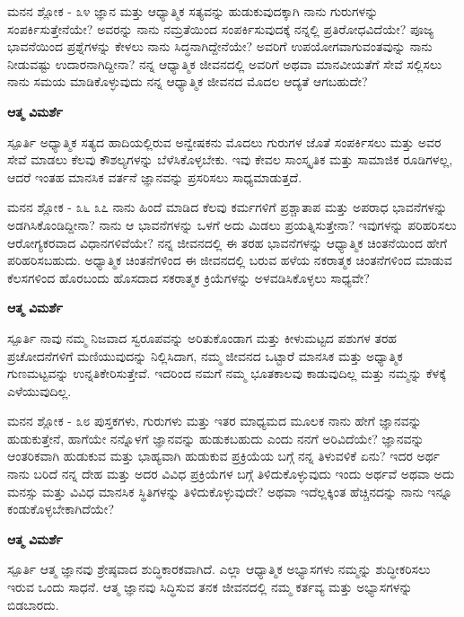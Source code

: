 \begin{mananam}{\mananamfont ಮನನ ಶ್ಲೋಕ - ೩೪}
\mananamtext ಜ್ಞಾನ ಮತ್ತು ಆಧ್ಯಾತ್ಮಿಕ ಸತ್ಯವನ್ನು ಹುಡುಕುವುದಕ್ಕಾಗಿ ನಾನು ಗುರುಗಳನ್ನು ಸಂಪರ್ಕಿಸುತ್ತೇನೆಯೇ? ಅವರನ್ನು ನಾನು ನಮ್ರತೆಯಿಂದ ಸಂಪರ್ಕಿಸುವುದಕ್ಕೆ ನನ್ನಲ್ಲಿ ಪ್ರತಿರೋಧವಿದೆಯೇ? ಪೂಜ್ಯ ಭಾವನೆಯಿಂದ ಪ್ರಶ್ನೆಗಳನ್ನು ಕೇಳಲು ನಾನು ಸಿದ್ಧನಾಗಿದ್ದೇನೆಯೇ? ಅವರಿಗೆ ಉಪಯೋಗವಾಗುವಂತವುನ್ನು ನಾನು ನೀಡುವಷ್ಟು ಉದಾರನಾಗಿದ್ದೀನಾ? ನನ್ನ ಆಧ್ಯಾತ್ಮಿಕ ಜೀವನದಲ್ಲಿ ಅವರಿಗೆ ಅಥವಾ ಮಾನವೀಯತೆಗೆ ಸೇವೆ ಸಲ್ಲಿಸಲು ನಾನು ಸಮಯ ಮಾಡಿಕೊಳ್ಳುವುದು ನನ್ನ ಆಧ್ಯಾತ್ಮಿಕ ಜೀವನದ ಮೊದಲ ಆದ್ಯತೆ ಆಗಬಹುದೇ?
\end{mananam}
\WritingHand\enspace\textbf{ಆತ್ಮ ವಿಮರ್ಶೆ}\\
\begin{inspiration}{\mananamfont ಸ್ಪೂರ್ತಿ}
\mananamtext ಅಧ್ಯಾತ್ಮಿಕ ಸತ್ಯದ ಹಾದಿಯಲ್ಲಿರುವ ಅನ್ವೇಷಕನು ಮೊದಲು ಗುರುಗಳ ಜೊತೆ ಸಂಪರ್ಕಿಸಲು ಮತ್ತು ಅವರ ಸೇವೆ ಮಾಡಲು ಕೆಲವು ಕೌಶಲ್ಯಗಳನ್ನು ಬೆಳೆಸಿಕೊಳ್ಳಬೇಕು. ಇವು ಕೇವಲ ಸಾಂಸ್ಕೃತಿಕ ಮತ್ತು ಸಾಮಾಜಿಕ ರೂಡಿಗಳಲ್ಲ, ಆದರೆ ಇಂತಹ ಮಾನಸಿಕ ವರ್ತನೆ ಜ್ಞಾನವನ್ನು ಪ್ರಸರಿಸಲು ಸಾಧ್ಯಮಾಡುತ್ತದೆ.
\end{inspiration}

\newpage
\begin{mananam}{\mananamfont ಮನನ ಶ್ಲೋಕ - ೩೬ ೩೭}
\mananamtext ನಾನು ಹಿಂದೆ ಮಾಡಿದ ಕೆಲವು ಕರ್ಮಗಳಿಗೆ ಪ್ರಶ್ಚಾತಾಪ  ಮತ್ತು ಅಪರಾಧ ಭಾವನೆಗಳನ್ನು ಅಡಗಿಸಿಕೊಂಡಿದ್ದೀನಾ? ನಾನು ಆ ಭಾವನೆಗಳನ್ನು ಒಳಗೆ ಅದು ಮಿಡಲು ಪ್ರಯತ್ನಿಸುತ್ತೇನಾ? ಇವುಗಳನ್ನು ಪರಿಹರಿಸಲು ಆರೋಗ್ಯಕರವಾದ ವಿಧಾನಗಳಿವೆಯೇ? ನನ್ನ ಜೀವನದಲ್ಲಿ ಈ ತರಹ ಭಾವನೆಗಳನ್ನು ಆಧ್ಯಾತ್ಮಿಕ ಚಿಂತನೆಯಿಂದ ಹೇಗೆ ಪರಿಹರಿಸಬಹುದು. ಅಧ್ಯಾತ್ಮಿಕ ಚಿಂತನೆಗಳಿಂದ ಈ ಜೀವನದಲ್ಲಿ ಬರುವ ಹಳೆಯ ನಕರಾತ್ಮಕ ಚಿಂತನೆಗಳಿಂದ ಮಾಡುವ ಕೆಲಸಗಳಿಂದ ಹೊರಬಂದು ಹೊಸದಾದ ಸಕರಾತ್ಮಕ ಕ್ರಿಯೆಗಳನ್ನು ಅಳವಡಿಸಿಕೊಳ್ಳಲು ಸಾಧ್ಯವೇ?\\
\end{mananam}
\WritingHand\enspace\textbf{ಆತ್ಮ ವಿಮರ್ಶೆ}\\
\begin{inspiration}{\mananamfont ಸ್ಪೂರ್ತಿ}
\mananamtext ನಾವು ನಮ್ಮ ನಿಜವಾದ ಸ್ವರೂಪವನ್ನು ಅರಿತುಕೊಂಡಾಗ ಮತ್ತು ಕೀಳುಮಟ್ಟದ ಪಶುಗಳ ತರಹ ಪ್ರಚೋದನೆಗಳಿಗೆ ಮಣಿಯುವುದನ್ನು ನಿಲ್ಲಿಸಿದಾಗ, ನಮ್ಮ ಜೀವನದ ಒಟ್ಟಾರೆ ಮಾನಸಿಕ ಮತ್ತು ಅಧ್ಯಾತ್ಮಿಕ ಗುಣಮಟ್ಟವನ್ನು ಉನ್ನತಿಕೇರಿಸುತ್ತೇವೆ. ಇದರಿಂದ ನಮಗೆ ನಮ್ಮ ಭೂತಕಾಲವು ಕಾಡುವುದಿಲ್ಲ ಮತ್ತು ನಮ್ಮನ್ನು ಕೆಳಕ್ಕೆ ಎಳೆಯುವುದಿಲ್ಲ.
\end{inspiration}
\newpage

\begin{mananam}{\mananamfont ಮನನ ಶ್ಲೋಕ - ೩೮}
\mananamtext ಪುಸ್ತಕಗಳು, ಗುರುಗಳು ಮತ್ತು ಇತರ ಮಾಧ್ಯಮದ ಮೂಲಕ ನಾನು ಹೇಗೆ ಜ್ಞಾನವನ್ನು ಹುಡುಕುತ್ತೇನೆ, ಹಾಗೆಯೇ ನನ್ನೊಳಗೆ ಜ್ಞಾನವನ್ನು ಹುಡುಕಬಹುದು ಎಂದು ನನಗೆ ಅರಿವಿದೆಯೇ? ಜ್ಞಾನವನ್ನು ಆಂತರಿಕವಾಗಿ ಹುಡುಕುವ ಮತ್ತು ಭಾಹ್ಯವಾಗಿ ಹುಡುಕುವ ಪ್ರಕ್ರಿಯೆಯ ಬಗ್ಗೆ ನನ್ನ ತಿಳುವಳಿಕೆ ಏನು? ಇದರ ಅರ್ಥ ನಾನು ಬರಿದೆ ನನ್ನ ದೇಹ ಮತ್ತು ಅದರ ವಿವಿಧ ಪ್ರಕ್ರಿಯೆಗಳ ಬಗ್ಗೆ ತಿಳಿದುಕೊಳ್ಳುವುದು ಇಂದು ಅರ್ಥವೆ ಅಥವಾ ಅದು ಮನಸ್ಸು ಮತ್ತು ವಿವಿಧ ಮಾನಸಿಕ ಸ್ಥಿತಿಗಳನ್ನು  ತಿಳಿದುಕೊಳ್ಳುವುದೇ?    ಅಥವಾ ಇದೆಲ್ಲಕ್ಕಿಂತ ಹೆಚ್ಚಿನದನ್ನು ನಾನು ಇನ್ನೂ ಕಂಡುಕೊಳ್ಳಬೇಕಾಗಿದೆಯೇ?\\
\end{mananam}
\WritingHand\enspace\textbf{ಆತ್ಮ ವಿಮರ್ಶೆ}\\
\begin{inspiration}{\mananamfont ಸ್ಪೂರ್ತಿ}
\mananamtext ಆತ್ಮ ಜ್ಞಾನವು ಶ್ರೇಷ್ಠವಾದ ಶುದ್ಧಿಕಾರಕವಾಗಿದೆ. ಎಲ್ಲಾ ಆಧ್ಯಾತ್ಮಿಕ ಅಭ್ಯಾಸಗಳು ನಮ್ಮನ್ನು ಶುದ್ಧೀಕರಿಸಲು ಇರುವ ಒಂದು ಸಾಧನೆ. ಆತ್ಮ ಜ್ಞಾನವು ಸಿದ್ಧಿಸುವ ತನಕ  ಜೀವನದಲ್ಲಿ ನಮ್ಮ ಕರ್ತವ್ಯ ಮತ್ತು ಅಭ್ಯಾಸಗಳನ್ನು ಬಿಡಬಾರದು.
\end{inspiration}
\newpage
 
